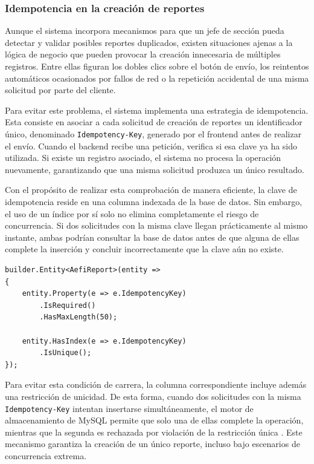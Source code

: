 \subsubsection{Idempotencia en la creación de reportes}

Aunque el sistema incorpora mecanismos para que un jefe de sección pueda detectar y validar posibles reportes duplicados, existen situaciones ajenas a la lógica de negocio que pueden provocar la creación innecesaria de múltiples registros. 
Entre ellas figuran los dobles clics sobre el botón de envío, los reintentos automáticos ocasionados por fallos de red o la repetición accidental de una misma solicitud por parte del cliente.

Para evitar este problema, el sistema implementa una estrategia de idempotencia.
Esta consiste en asociar a cada solicitud de creación de reportes un identificador único, denominado \texttt{Idempotency-Key}, generado por el frontend antes de realizar el envío. 
Cuando el backend recibe una petición, verifica si esa clave ya ha sido utilizada. 
Si existe un registro asociado, el sistema no procesa la operación nuevamente, garantizando que una misma solicitud produzca un único resultado.

Con el propósito de realizar esta comprobación de manera eficiente, la clave de idempotencia reside en una columna indexada de la base de datos. 
Sin embargo, el uso de un índice por sí solo no elimina completamente el riesgo de concurrencia. Si dos solicitudes con la misma clave llegan prácticamente al mismo instante, ambas podrían consultar la base de datos antes de que alguna de ellas complete la inserción y concluir incorrectamente que la clave aún no existe.

\begin{lstlisting}[language={[Sharp]C}, caption={Definición de la clave de idempotencia}, label={lst}]
builder.Entity<AefiReport>(entity =>
{
    entity.Property(e => e.IdempotencyKey)
        .IsRequired()
        .HasMaxLength(50);

    entity.HasIndex(e => e.IdempotencyKey)
        .IsUnique();
});
\end{lstlisting}

Para evitar esta condición de carrera, la columna correspondiente incluye además una restricción de unicidad. 
De esta forma, cuando dos solicitudes con la misma \texttt{Idempotency-Key} intentan insertarse simultáneamente, el motor de almacenamiento de MySQL permite que solo una de ellas complete la operación, mientras que la segunda es rechazada por violación de la restricción única \cite{mysql_isolation}. 
Este mecanismo garantiza la creación de un único reporte, incluso bajo escenarios de concurrencia extrema.

